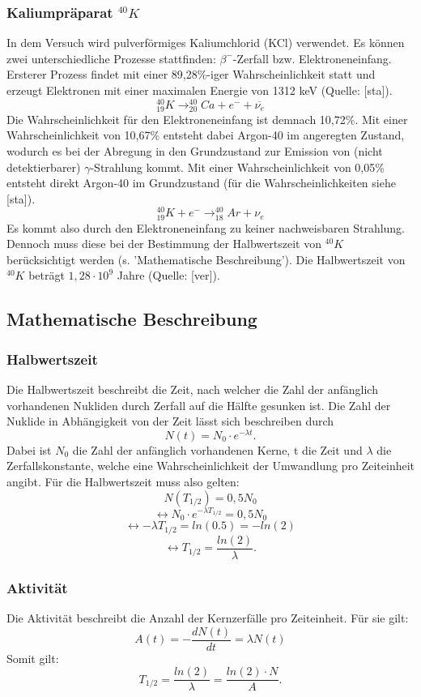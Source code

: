 \subsubsection{Kaliumpräparat $^{40}K$}
In dem Versuch wird pulverförmiges Kaliumchlorid (KCl) verwendet. Es können zwei unterschiedliche Prozesse stattfinden: $\beta^{-}$-Zerfall bzw. Elektroneneinfang. Ersterer Prozess findet mit einer 89,28\%-iger Wahrscheinlichkeit statt und erzeugt Elektronen mit einer maximalen Energie von 1312 keV (Quelle: [sta]). \[^{40}_{19}K\rightarrow ^{40}_{20}Ca+e^{-}+\overline{\nu_{e}}\]Die Wahrscheinlichkeit für den Elektroneneinfang ist demnach 10,72\%. Mit einer Wahrscheinlichkeit von 10,67\% entsteht dabei Argon-40 im angeregten Zustand, wodurch es bei der Abregung in den Grundzustand zur Emission von (nicht detektierbarer) $\gamma$-Strahlung kommt. Mit einer Wahrscheinlichkeit von 0,05\% entsteht direkt Argon-40 im Grundzustand (für die Wahrscheinlichkeiten siehe [sta]).
\[^{40}_{19}K+e^{-}\rightarrow ^{40}_{18}Ar+\nu_{e}\]
 Es kommt also durch den Elektroneneinfang zu keiner nachweisbaren Strahlung. Dennoch muss diese bei der Bestimmung der Halbwertszeit von $^{40}K$ berücksichtigt werden (s. 'Mathematische Beschreibung'). Die Halbwertszeit von $^{40}K$ beträgt $1,28\cdot10^{9}$ Jahre (Quelle: [ver]).
 \subsection{Mathematische Beschreibung}
 \subsubsection{Halbwertszeit}
 Die Halbwertszeit beschreibt die Zeit, nach welcher die Zahl der anfänglich vorhandenen Nukliden durch Zerfall auf die Hälfte gesunken ist. Die Zahl der Nuklide in Abhängigkeit von der Zeit lässt sich beschreiben durch \[N(t)=N_{0}\cdot e^{-\lambda t}.\] Dabei ist $N_{0}$ die Zahl der anfänglich vorhandenen Kerne, t die Zeit und $\lambda$ die Zerfallskonstante, welche eine Wahrscheinlichkeit der Umwandlung pro Zeiteinheit angibt. Für die Halbwertszeit muss also gelten: \[N(T_{1/2})=0,5N_{0}\]
 \[\leftrightarrow N_{0}\cdot e^{-\lambda T_{1/2}}=0,5N_{0}\]
 \[\leftrightarrow -\lambda T_{1/2}=ln(0.5)=-ln(2)\]
 \[\leftrightarrow T_{1/2}=\frac{ln(2)}{\lambda}.\]
 \subsubsection{Aktivität}
 Die Aktivität beschreibt die Anzahl der Kernzerfälle pro Zeiteinheit. Für sie gilt: \[A(t)=-\frac{dN(t)}{dt}=\lambda N(t)\]
 Somit gilt: \[T_{1/2}=\frac{ln(2)}{\lambda}=\frac{ln(2)\cdot N}{A}.\]
